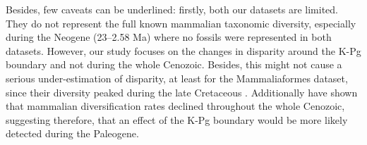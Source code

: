 \documentclass[12pt,letterpaper]{article}
\begin{document}
Besides, few caveats can be underlined: firstly, both our datasets are limited.
They do not represent the full known mammalian taxonomic diversity, especially during the Neogene (23--2.58 Ma) where no fossils were represented in both datasets.
However, our study focuses on the changes in disparity around the K-Pg boundary and not during the whole Cenozoic.
Besides, this might not cause a serious under-estimation of disparity, at least for the Mammaliaformes dataset, since their diversity peaked during the late Cretaceous \citep[Campanian; 72.1--83.6 Ma;][]{Newham201432}.
Additionally \cite{Raia2012} have shown that mammalian diversification rates declined throughout the whole Cenozoic, suggesting therefore, that an effect of the K-Pg boundary would be more likely detected during the Paleogene. %


\end{document}
